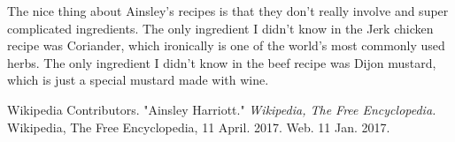 \documentclass[11pt]{article}
\begin{document}
The nice thing about Ainsley's recipes is that they don't really involve and super complicated ingredients. The only ingredient I didn't know in the Jerk chicken recipe was Coriander, which ironically is one of the world's most commonly used herbs. The only ingredient I didn't know in the beef recipe was Dijon mustard, which is just a special mustard made with wine.

\newpage

\begin{thebibliography}{9}
Wikipedia Contributors. "Ainsley Harriott." \textit{Wikipedia, The Free Encyclopedia.} Wikipedia, The Free Encyclopedia, 11 April. 2017. Web. 11 Jan. 2017.
\end{thebibliography}
\end{document}
